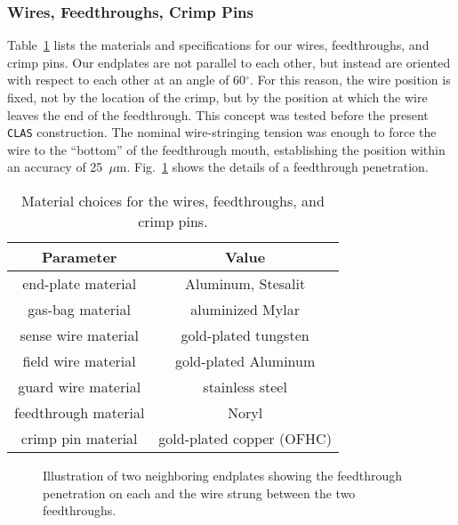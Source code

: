 \documentclass[12pt]{article}
\begin{document}
\subsubsection{Wires, Feedthroughs, Crimp Pins}

Table~\ref{wirechoices} lists the materials and specifications for our wires, 
feedthroughs, and crimp pins.  Our endplates are not parallel to each other, 
but instead are oriented with respect to each other at an angle of 60$^\circ$.  
For this reason, the wire position is fixed, not by the location of the crimp, 
but by the position at which the wire leaves the end of the feedthrough.  This 
concept was tested before the present {\tt CLAS} construction.  The nominal 
wire-stringing tension was enough to force the wire to the ``bottom'' of the 
feedthrough mouth, establishing the position within an accuracy of 25~$\mu$m.  
Fig.~\ref{feedthrough} shows the details of a feedthrough penetration.

\begin{table}[htbp]
\begin{center}
\begin{tabular} {||c|c||} \hline \hline
{\bf Parameter}      &  {\bf Value} \\ \hline
end-plate material & Aluminum, Stesalit \\ \hline
gas-bag material & aluminized Mylar \\ \hline
sense wire material   & gold-plated tungsten \\ \hline
field wire material   & gold-plated Aluminum \\ \hline
guard wire material   & stainless steel \\ \hline
feedthrough material & Noryl \\ \hline
crimp pin material & gold-plated copper (OFHC) \\ \hline \hline
\end{tabular}
\caption{\small{Material choices for the wires, feedthroughs, and crimp pins.}}
\label{wirechoices}
\end{center}
\end{table}

\begin{figure}[htbp]
\vspace{5.5cm}
\caption{\small{Illustration of two neighboring endplates showing the feedthrough 
penetration on each and the wire strung between the two feedthroughs.}}
\label{feedthrough}
\end{figure}
\end{document}
